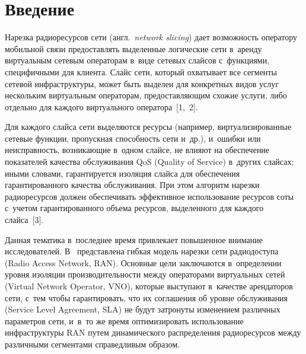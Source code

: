   

 



\thispagestyle{headings}

\begin{multicols}{2}

\label{st\stat}
  
\section{Введение}

\vspace*{-2pt}

  Нарезка радиоресурсов сети (англ.\ \textit{network slicing}) дает возможность 
оператору мобильной связи предоставлять выделенные логические сети 
в~аренду виртуальным сетевым операторам в~виде сетевых слайсов 
с~функциями, специфичными для клиента. Слайс сети, который охватывает все 
сегменты сетевой инфраструктуры, может быть выделен для конкретных видов 
услуг нескольким виртуальным операторам, предоставляющим схожие услуги, 
либо отдельно для каждого виртуального оператора~[1,~2].
  
  Для каждого слайса сети выделяются ресурсы (например, 
виртуализированные сетевые функции, пропускная способность сети и~др.), 
и~ошибки или неисправность, возникающие в~одном слайсе, не влияют на 
обеспечение показателей качества обслуживания QoS (Quality of Service) 
в~других слайсах; иными словами, гарантируется изоляция слайса для 
обеспечения гарантированного качества обслуживания. При этом алгоритм 
нарезки радиоресурсов должен обеспечивать эффективное использование 
ресурсов соты с~учетом гарантированного объема ресурсов, выделенного для 
каждого слайса~[3].
  
  Данная тематика в~последнее время привлекает повышенное внимание 
исследователей. В~\cite{4-sop} представлена гибкая модель нарезки сети 
радиодоступа (Radio Access Network, RAN). Основные цели заключаются 
в~определении уровня изоляции производительности между операторами 
виртуальных сетей (Virtual Network Operator, VNO), которые выступают 
в~качестве арендаторов сети, с~тем чтобы гарантировать, что их соглашения об 
уровне обслуживания (Service Level Agreement, SLA) не будут затронуты 
изменением различных параметров сети, и~в~то же время оптимизировать 
использование инфраструктуры RAN путем динамического распределения 
радиоресурсов между различными сегментами справедливым образом. 
  

\end{multicols}
